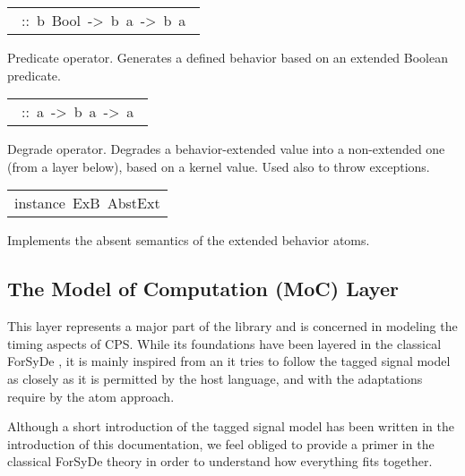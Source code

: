 \begin{haddockdesc}
\begin{haddockdesc}
\item[\begin{tabular}{@{}l}\haddockid{(/\&\textbackslash)}\ ::\ b\ Bool\ ->\ b\ a\ ->\ b\ a\ \end{tabular}]
\haddockbegindoc
Predicate operator. Generates a defined behavior based on an extended Boolean predicate.\par

\item[\begin{tabular}{@{}l}\haddockid{(/"!\textbackslash)}\ ::\ a\ ->\ b\ a\ ->\ a\ \end{tabular}]
\haddockbegindoc
Degrade operator. Degrades a behavior-extended value into a non-extended one (from a layer below), based on a kernel value. Used also to throw exceptions.\par

\end{haddockdesc}


\item[\begin{tabular}{@{}l}
instance\ ExB\ AbstExt
\end{tabular}]\haddockbegindoc
Implements the absent semantics of the extended behavior atoms.\par

\end{haddockdesc}
\subsection{The Model of Computation (MoC) Layer}
This layer represents a major part of the 
 library and is concerned in modeling the timing aspects of
 CPS. While its foundations have been layered in the classical
 ForSyDe \cite{Sander04}, it is mainly inspired from
 \cite{Lee98} an it tries to follow the tagged signal model as
 closely as it is permitted by the host language, and with the
 adaptations require by the atom approach.\par
Although a short introduction of the tagged signal model has been
 written in the introduction of this documentation, we feel
 obliged to provide a primer in the classical ForSyDe theory in
 order to understand how everything fits together.\par

